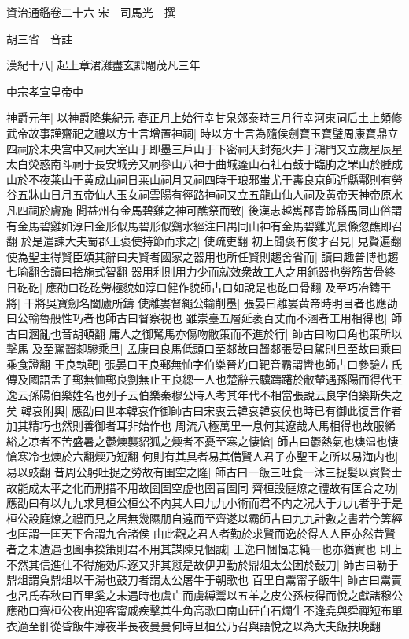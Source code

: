 資治通鑑卷二十六
宋　司馬光　撰

胡三省　音註

漢紀十八|{
	起上章涒灘盡玄黓閹茂凡三年}


中宗孝宣皇帝中

神爵元年|{
	以神爵降集紀元}
春正月上始行幸甘泉郊泰畤三月行幸河東祠后土上頗修武帝故事謹齋祀之禮以方士言增置神祠|{
	時以方士言為隨侯劍寶玉寶璧周康寶鼎立四祠於未央宫中又祠大室山于即墨三戶山于下密祠天封苑火井于鴻門又立歲星辰星太白熒惑南斗祠于長安城旁又祠參山八神于曲城蓬山石社石鼓于臨朐之罘山於腄成山於不夜莱山于黄成山祠日莱山祠月又祠四時于琅邪蚩尤于夀良京師近縣鄠則有勞谷五牀山日月五帝仙人玉女祠雲陽有徑路神祠又立五龍山仙人祠及黄帝天神帝原水凡四祠於膚施}
聞益州有金馬碧雞之神可醮祭而致|{
	後漢志越嶲郡青蛉縣禺同山俗謂有金馬碧雞如淳曰金形似馬碧形似鷄水經注曰禺同山神有金馬碧雞光景儵忽醮即召翻}
於是遣諫大夫蜀郡王褒使持節而求之|{
	使疏吏翻}
初上聞褒有俊才召見|{
	見賢遍翻}
使為聖主得賢臣頌其辭曰夫賢者國家之器用也所任賢則趨舍省而|{
	讀曰趣普博也趨七喻翻舍讀曰捨施式智翻}
器用利則用力少而就效衆故工人之用鈍器也勞筋苦骨終日矻矻|{
	應劭曰矻矻勞極貌如淳曰健作貌師古曰如說是也矻口骨翻}
及至巧冶鑄干將|{
	干將吳寶劒名闔廬所鑄}
使離婁督繩公輸削墨|{
	張晏曰離婁黄帝時明目者也應劭曰公輸魯般性巧者也師古曰督察視也}
雖崇臺五層延袤百丈而不溷者工用相得也|{
	師古曰溷亂也音胡頓翻}
庸人之御駑馬亦傷吻敝策而不進於行|{
	師古曰吻口角也策所以撃馬}
及至駕齧厀驂乘旦|{
	孟康曰良馬低頭口至䣛故曰齧䣛張晏曰駕則旦至故曰乘曰乘食證翻}
王良執靶|{
	張晏曰王良郵無恤字伯樂晉灼曰靶音霸謂轡也師古曰參驗左氏傳及國語孟子郵無恤郵良劉無止王良總一人也楚辭云驥躊躇於敝輦遇孫陽而得代王逸云孫陽伯樂姓名也列子云伯樂秦穆公時人考其年代不相當張說云良字伯樂斯失之矣}
韓哀附輿|{
	應劭曰世本韓哀作御師古曰宋衷云韓哀韓哀侯也時已有御此復言作者加其精巧也然則善御者耳非始作也}
周流八極萬里一息何其遼哉人馬相得也故服絺綌之凉者不苦盛暑之鬱燠襲貂狐之煗者不憂至寒之悽愴|{
	師古曰鬱熱氣也燠温也悽愴寒冷也燠於六翻煗乃短翻}
何則有其具者易其備賢人君子亦聖王之所以易海内也|{
	易以豉翻}
昔周公躬吐捉之勞故有圉空之隆|{
	師古曰一飯三吐食一沐三捉髪以賓賢士故能成太平之化而刑措不用故囹圄空虚也圉音圄同}
齊桓設庭燎之禮故有匡合之功|{
	應劭曰有以九九求見桓公桓公不内其人曰九九小術而君不内之况大于九九者乎于是桓公設庭燎之禮而見之居無幾隰朋自遠而至齊遂以霸師古曰九九計數之書若今筭經也匡謂一匡天下合謂九合諸侯}
由此觀之君人者勤於求賢而逸於得人人臣亦然昔賢者之未遭遇也圖事揆策則君不用其謀陳見悃誠|{
	王逸曰悃愊志純一也亦猶實也}
則上不然其信進仕不得施効斥逐又非其愆是故伊尹勤於鼎俎太公困於鼔刀|{
	師古曰勒于鼎俎謂負鼎俎以干湯也鼓刀者謂太公屠牛于朝歌也}
百里自鬻甯子飯牛|{
	師古曰鬻賣也呂氏春秋曰百里奚之未遇時也虞亡而虜縛鬻以五羊之皮公孫枝得而悅之獻諸穆公應劭曰齊桓公夜出迎客甯戚疾擊其牛角高歌曰南山矸白石爛生不逢堯與舜禪短布單衣適至骭從昏飯牛薄夜半長夜曼曼何時旦桓公乃召與語悅之以為大夫飯扶晚翻}
